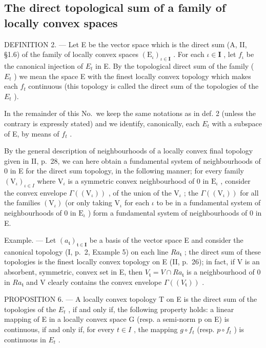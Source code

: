 \subsection{The direct topological sum of a family of locally convex spaces}

DEFINITION 2. --- Let E be the vector space which is the direct sum (A, II, §1.6) of the family of locally convex spaces \((\mathrm{E}_{\iota})_{\iota \in \mathbf{I}}\) . For each \(\iota \in \mathbf{I}\) , let \(f_{\iota}\) be the canonical injection of \(E_{t}\) in E. By the topological direct sum of the family ( \(E_{t}\) ) we mean the space E with the finest locally convex topology which makes each \(f_{t}\) continuous (this topology is called the direct sum of the topologies of the \(E_{t}\) ).

In the remainder of this No.~we keep the same notations as in def. 2 (unless the contrary is expressly stated) and we identify, canonically, each \(E_{t}\) with a subspace of E, by means of \(f_{t}\) .

By the general description of neighbourhoods of a locally convex final topology given in II, p.~28, we can here obtain a fundamental system of neighbourhoods of 0 in E for the direct sum topology, in the following manner; for every family \((\mathrm{V}_{\iota})_{\iota \in I}\) where \(\mathrm{V}_{\iota}\) is a symmetric convex neighbourhood of 0 in \(\mathrm{E}_{\iota}\) , consider the convex envelope \(\Gamma((\mathrm{V}_{\iota}))\) , of the union of the \(\mathrm{V}_{\iota}\) ; the \(\Gamma((\mathrm{V}_{\iota}))\) for all the families \((\mathrm{V}_{\iota})\) (or only taking \(\mathrm{V}_{\iota}\) for each \(\iota\) to be in a fundamental system of neighbourhoods of 0 in \(\mathrm{E}_{\iota}\) ) form a fundamental system of neighbourhoods of 0 in E.

Example. --- Let \((a_{\mathfrak{t}})_{\mathfrak{t}\in\mathbf{I}}\) be a basis of the vector space E and consider the canonical topology (I, p.~2, Example 5) on each line \(Ra_{\mathfrak{t}}\) ; the direct sum of these topologies is the finest locally convex topology on E (II, p.~26); in fact, if V is an absorbent, symmetric, convex set in E, then \(V_{\mathfrak{t}} = V \cap Ra_{\mathfrak{t}}\) is a neighbourhood of 0 in \(Ra_{\mathfrak{t}}\) and V clearly contains the convex envelope \(\Gamma((V_{\mathfrak{t}}))\) .

PROPOSITION 6. --- A locally convex topology T on E is the direct sum of the topologies of the \(E_{t}\) , if and only if, the following property holds: a linear mapping of E in a locally convex space G (resp. a semi-norm p on E) is continuous, if and only if, for every \(t \in I\) , the mapping \(g \circ f_{t}\) (resp. \(p \circ f_{t}\) ) is continuous in \(E_{t}\) .


